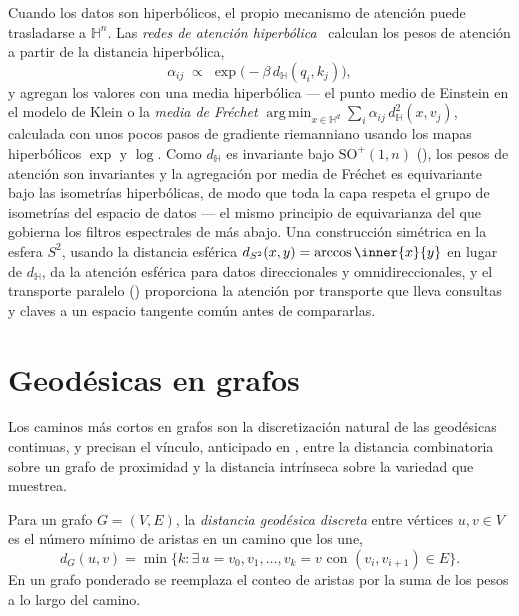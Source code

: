 Cuando los datos son hiperb\'olicos, el propio mecanismo de atenci\'on puede
trasladarse a $\mathbb{H}^n$. Las \emph{redes de atenci\'on
hiperb\'olica}~\citep{gulcehre2019hyperbolic} calculan los pesos de atenci\'on a
partir de la distancia hiperb\'olica,
\[
  \alpha_{ij} \;\propto\; \exp\!\big({-}\beta\, d_{\mathbb{H}}(q_i, k_j)\big),
\]
y agregan los valores con una media hiperb\'olica --- el punto medio de Einstein
en el modelo de Klein o la \emph{media de Fr\'echet}
$\operatorname*{arg\,min}_{x \in \mathbb{H}^d} \sum_i \alpha_{ij}\,
d_{\mathbb{H}}^2(x, v_j)$, calculada con unos pocos pasos de gradiente
riemanniano usando los mapas hiperb\'olicos $\exp$ y $\log$. Como
$d_{\mathbb{H}}$ es invariante bajo $\mathrm{SO}^+(1,n)$
(), los pesos de atenci\'on son invariantes y
la agregaci\'on por media de Fr\'echet es equivariante bajo las isometr\'ias
hiperb\'olicas, de modo que toda la capa respeta el grupo de isometr\'ias del
espacio de datos --- el mismo principio de equivarianza del  que
gobierna los filtros espectrales de m\'as abajo. Una construcci\'on sim\'etrica
en la esfera $S^2$, usando la distancia esf\'erica
$d_{S^2}(x,y) = \arccos\inner{x}{y}$ en lugar de $d_{\mathbb{H}}$, da la
atenci\'on esf\'erica para datos direccionales y omnidireccionales, y el
transporte paralelo () proporciona la atenci\'on por
transporte que lleva consultas y claves a un espacio tangente com\'un antes de
compararlas.

\section{Geod\'esicas en grafos}
\label{sec:geo:graphs}

Los caminos m\'as cortos en grafos son la discretizaci\'on natural de las
geod\'esicas continuas, y precisan el v\'inculo, anticipado en ,
entre la distancia combinatoria sobre un grafo de proximidad y la distancia
intr\'inseca sobre la variedad que muestrea.

\begin{definition}
\label{def:geo:graph-distance}
Para un grafo $G = (V, E)$, la \emph{distancia geod\'esica discreta} entre
v\'ertices $u, v \in V$ es el n\'umero m\'inimo de aristas en un camino que los
une,
\[
  d_G(u,v) = \min\{ k : \exists\, u = v_0, v_1, \dots, v_k = v
    \text{ con } (v_i, v_{i+1}) \in E\}.
\]
En un grafo ponderado se reemplaza el conteo de aristas por la suma de los pesos
a lo largo del camino.
\end{definition}

